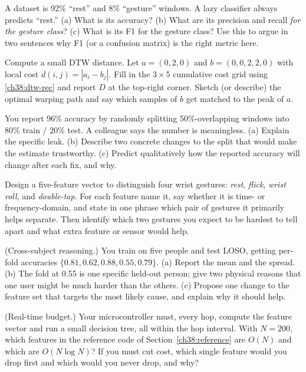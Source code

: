 \begin{exercise}
A dataset is 92\% ``rest'' and 8\% ``gesture'' windows. A lazy classifier always
predicts ``rest.'' (a) What is its accuracy? (b) What are its precision and recall
\emph{for the gesture class}? (c) What is its F1 for the gesture class? Use this to
argue in two sentences why F1 (or a confusion matrix) is the right metric here.
\end{exercise}

\begin{exercise}
Compute a small DTW distance. Let $a = (0, 2, 0)$ and $b = (0, 0, 2, 2, 0)$ with
local cost $d(i,j) = |a_i - b_j|$. Fill in the $3\times 5$ cumulative cost grid
using \eqref{ch38:dtw-rec} and report $D$ at the top-right corner. Sketch (or
describe) the optimal warping path and say which samples of $b$ get matched to the
peak of $a$.
\end{exercise}

\begin{exercise}
You report 96\% accuracy by randomly splitting 50\%-overlapping windows into 80\%
train / 20\% test. A colleague says the number is meaningless. (a) Explain the
specific leak. (b) Describe two concrete changes to the split that would make the
estimate trustworthy. (c) Predict qualitatively how the reported accuracy will change
after each fix, and why.
\end{exercise}

\begin{exercise}
Design a five-feature vector to distinguish four wrist gestures: \emph{rest},
\emph{flick}, \emph{wrist roll}, and \emph{double-tap}. For each feature name it,
say whether it is time- or frequency-domain, and state in one phrase which pair of
gestures it primarily helps separate. Then identify which two gestures you expect
to be hardest to tell apart and what extra feature or sensor would help.
\end{exercise}

\begin{exercise}
(Cross-subject reasoning.) You train on five people and test LOSO, getting per-fold
accuracies $\{0.81, 0.62, 0.88, 0.55, 0.79\}$. (a) Report the mean and the spread.
(b) The fold at 0.55 is one specific held-out person; give two physical reasons
that one user might be much harder than the others. (c) Propose one change to the
feature set that targets the most likely cause, and explain why it should help.
\end{exercise}

\begin{exercise}
(Real-time budget.) Your microcontroller must, every hop, compute the feature
vector and run a small decision tree, all within the hop interval. With
$N = 200$, which features in the reference code of Section~\ref{ch38:reference} are
$O(N)$ and which are $O(N\log N)$? If you must cut cost, which single feature would
you drop first and which would you never drop, and why?
\end{exercise}

